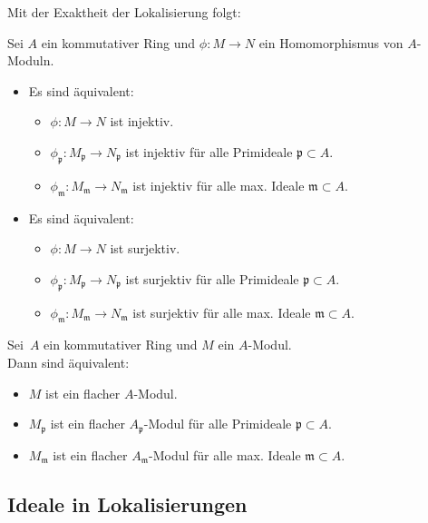 \documentclass{cheat-sheet}
\newcommand{\ppp}{\mathfrak{p}}
\newcommand{\mmm}{\mathfrak{m}}
\begin{document}

Mit der Exaktheit der Lokalisierung folgt:

\begin{kor}
  Sei $A$ ein kommutativer Ring und $\phi : M \to N$ ein Homomorphismus von $A$-Moduln.
  \begin{itemize}
    \item Es sind äquivalent:
    \begin{itemize}
      \item $\phi : M \to N$ ist injektiv.
      \item $\phi_\ppp : M_\ppp \to N_\ppp$ ist injektiv für alle Primideale $\ppp \subset A$.
      \item $\phi_\mmm : M_\mmm \to N_\mmm$ ist injektiv für alle max. Ideale $\mmm \subset A$.
    \end{itemize}
    \item Es sind äquivalent:
    \begin{itemize}
      \item $\phi : M \to N$ ist surjektiv.
      \item $\phi_\ppp : M_\ppp \to N_\ppp$ ist surjektiv für alle Primideale $\ppp \subset A$.
      \item $\phi_\mmm : M_\mmm \to N_\mmm$ ist surjektiv für alle max. Ideale $\mmm \subset A$.
    \end{itemize}
  \end{itemize}
\end{kor}


\begin{prop}
  Sei~$A$ ein kommutativer Ring und $M$ ein $A$-Modul. \\
  Dann sind äquivalent:
  \begin{itemize}
    \item $M$ ist ein flacher $A$-Modul.
    \item $M_\ppp$ ist ein flacher $A_\ppp$-Modul für alle Primideale $\ppp \subset A$.
    \item $M_\mmm$ ist ein flacher $A_\mmm$-Modul für alle max. Ideale $\mmm \subset A$.
  \end{itemize}
\end{prop}

\subsection{Ideale in Lokalisierungen}
\end{document}
